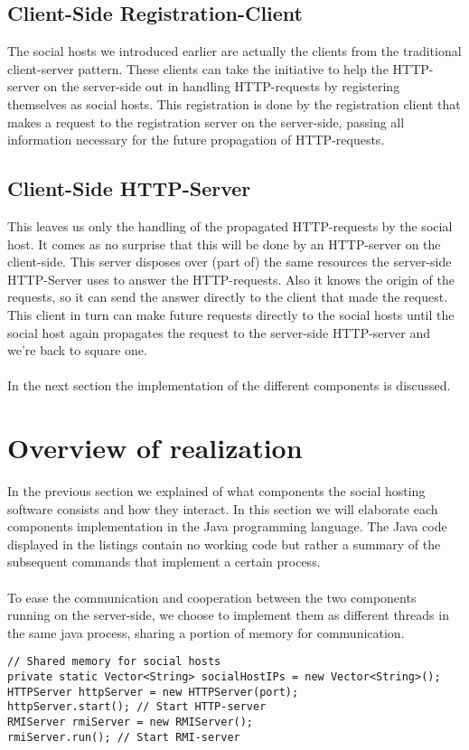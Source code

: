 \documentclass[a4paper, 10pt]{article}
\begin{document}
\subsection{Client-Side Registration-Client}
The social hosts we introduced earlier are actually the clients from the traditional client-server pattern. These clients can take the initiative to help the HTTP-server on the server-side out in handling HTTP-requests by registering themselves as social hosts. This registration is done by the registration client that makes a request to the registration server on the server-side, passing all information necessary for the future propagation of HTTP-requests. 

\subsection{Client-Side HTTP-Server}
This leaves us only the handling of the propagated HTTP-requests by the social host. It comes as no surprise that this will be done by an HTTP-server on the client-side. This server disposes over (part of) the same resources the server-side HTTP-Server uses to answer the HTTP-requests. Also it knows the origin of the requests, so it can send the answer directly to the client that made the request. This client in turn can make future requests directly to the social hosts until the social host again propagates the request to the server-side HTTP-server and we're back to square one.
\\
\\
In the next section the implementation of the different components is discussed.

\section{Overview of realization}

In the previous section we explained of what components the social hosting software consists and how they interact. In this section we will elaborate each components implementation in the Java programming language. The Java code displayed in the listings contain no working code but rather a summary of the subsequent commands that implement a certain process.
\\
\\
To ease the communication and cooperation between the two components running on the server-side, we choose to implement them as different threads in the same java process, sharing a portion of memory for communication.
\begin{lstlisting}
// Shared memory for social hosts
private static Vector<String> socialHostIPs = new Vector<String>(); 
HTTPServer httpServer = new HTTPServer(port); 
httpServer.start(); // Start HTTP-server
RMIServer rmiServer = new RMIServer();
rmiServer.run(); // Start RMI-server
\end{lstlisting}
\end{document}

